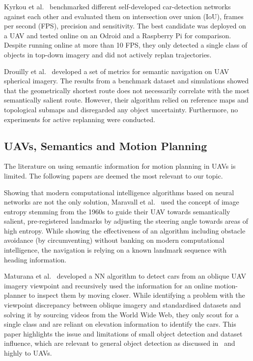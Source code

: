 \documentclass[a4paper,12pt]{article}
\theoremstyle{mytheor}
\begin{document}
Kyrkou et al.~\cite{kyrkou_dronet:_2018} benchmarked different self-developed car-detection networks against each other and evaluated them on intersection over union (IoU), frames per second (FPS), precision and sensitivity. The best candidate was deployed on a UAV and tested online on an Odroid and a Raspberry Pi for comparison. Despite running online at more than 10 FPS, they only detected a single class of objects in top-down imagery and did not actively replan trajectories.

Drouilly et al.~\cite{drouilly_semantic_2015} developed a set of metrics for semantic navigation on UAV spherical imagery. The results from a benchmark dataset and simulations showed that the geometrically shortest route does not necessarily correlate with the most semantically salient route. However, their algorithm relied on reference maps and topological submaps and disregarded any object uncertainty. Furthermore, no experiments for active replanning were conducted.

\subsection{UAVs, Semantics and Motion Planning} \label{subsec:LitUAVSemActive}
The literature on using semantic information for motion planning in UAVs is limited. The following papers are deemed the most relevant to our topic.

Showing that modern computational intelligence algorithms based on neural networks are not the only solution, Maravall et al.~\cite{maravall_navigation_2017} used the concept of image entropy stemming from the 1960s to guide their UAV towards semantically salient, pre-registered landmarks by adjusting the steering angle towards areas of high entropy. While showing the effectiveness of an algorithm including obstacle avoidance (by circumventing) without banking on modern computational intelligence, the navigation is relying on a known landmark sequence with heading information.

Maturana et al.~\cite{maturana_looking_2017} developed a NN algorithm to detect cars from an oblique UAV imagery viewpoint and recursively used the information for an online motion-planner to inspect them by moving closer. While identifying a problem with the viewpoint discrepancy between oblique imagery and standardised datasets and solving it by sourcing videos from the World Wide Web, they only scout for a single class and are reliant on elevation information to identify the cars. This paper highlights the issue and limitations of small object detection and dataset influence, which are relevant to general object detection as discussed in~\cite{liu_deep_2019} and highly to UAVs.
\end{document}
